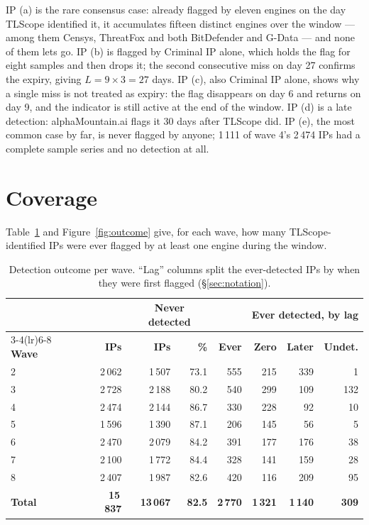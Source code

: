 IP (a) is the rare consensus case: already flagged by eleven engines on the day TLScope identified
it, it accumulates fifteen distinct engines over the window --- among them Censys, ThreatFox and both
BitDefender and G-Data --- and none of them lets go. IP (b) is flagged by Criminal IP alone, which
holds the flag for eight samples and then drops it; the second consecutive miss on day 27 confirms
the expiry, giving $L = 9 \times 3 = 27$ days. IP (c), also Criminal IP alone, shows why a single
miss is not treated as expiry: the flag disappears on day 6 and returns on day 9, and the indicator
is still active at the end of the window. IP (d) is a late detection: alphaMountain.ai flags it 30
days after TLScope did. IP (e), the most common case by far, is never flagged by anyone; 1\,111 of
wave 4's 2\,474 IPs had a complete sample series and no detection at all.

\section{Coverage}
\label{sec:coverage}

Table~\ref{tab:detection_overview} and Figure~\ref{fig:outcome} give, for each wave, how many
TLScope-identified IPs were ever flagged by at least one engine during the window.

\begin{table}[h]
  \centering
  \caption{Detection outcome per wave. ``Lag'' columns split the ever-detected IPs by when they were
    first flagged (\S\ref{sec:notation}).}
  \label{tab:detection_overview}
  \small
  \begin{tabular}{lrrrrrrr}
    \toprule
    & & \multicolumn{2}{c}{\textbf{Never detected}} & & \multicolumn{3}{c}{\textbf{Ever detected, by lag}} \\
    \cmidrule(lr){3-4}\cmidrule(lr){6-8}
    \textbf{Wave} & \textbf{IPs} & \textbf{IPs} & \textbf{\%} & \textbf{Ever} & \textbf{Zero} & \textbf{Later} & \textbf{Undet.} \\
    \midrule
    2 & 2\,062 & 1\,507 & 73.1 & 555 & 215 & 339 &   1 \\
    3 & 2\,728 & 2\,188 & 80.2 & 540 & 299 & 109 & 132 \\
    4 & 2\,474 & 2\,144 & 86.7 & 330 & 228 &  92 &  10 \\
    5 & 1\,596 & 1\,390 & 87.1 & 206 & 145 &  56 &   5 \\
    6 & 2\,470 & 2\,079 & 84.2 & 391 & 177 & 176 &  38 \\
    7 & 2\,100 & 1\,772 & 84.4 & 328 & 141 & 159 &  28 \\
    8 & 2\,407 & 1\,987 & 82.6 & 420 & 116 & 209 &  95 \\
    \midrule
    \textbf{Total} & \textbf{15\,837} & \textbf{13\,067} & \textbf{82.5} & \textbf{2\,770}
      & \textbf{1\,321} & \textbf{1\,140} & \textbf{309} \\
    \bottomrule
  \end{tabular}
\end{table}

